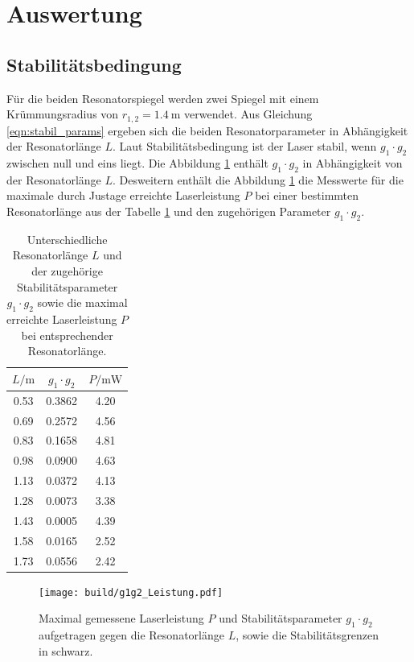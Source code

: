 \section{Auswertung}
\label{sec:Auswertung}



\subsection{Stabilitätsbedingung}
\label{subsec:Stabil}
Für die beiden Resonatorspiegel werden zwei Spiegel mit einem
Krümmungsradius von $r_{1,2}=\SI{1.4}{\meter}$ verwendet.
Aus Gleichung \eqref{eqn:stabil_params} ergeben sich die beiden
Resonatorparameter in Abhängigkeit der Resonatorlänge $L$.
Laut Stabilitätsbedingung ist der Laser stabil,
wenn $g_1\cdot g_2$ zwischen null und eins liegt.
Die Abbildung \ref{fig:oberaffengeilerplot} enthält $g_1 \cdot g_2$
in Abhängigkeit von der Resonatorlänge $L$.
Desweitern enthält die Abbildung \ref{fig:oberaffengeilerplot}
die Messwerte
für die maximale durch Justage
erreichte Laserleistung $P$
bei einer bestimmten Resonatorlänge
aus der Tabelle \ref{tab:stabil}
und den zugehörigen Parameter $g_1 \cdot g_2$.

\begin{table}
  \centering
  \caption{Unterschiedliche Resonatorlänge $L$ und der zugehörige Stabilitätsparameter $g_1 \cdot g_2$
  sowie die maximal erreichte Laserleistung $P$ bei entsprechender Resonatorlänge.}
  \label{tab:stabil}
  \begin{tabular}{ccc}
\toprule
$L/ \si{\meter}$ & $g_1 \cdot g_2$ & $ P/ \si{\milli\watt}$\\
\midrule
0.53	&	0.3862	&	4.20   \\
0.69	&	0.2572	&	4.56   \\
0.83	&	0.1658	&	4.81   \\
0.98	&	0.0900	&	4.63   \\
1.13	&	0.0372	&	4.13   \\
1.28	&	0.0073	&	3.38   \\
1.43	&	0.0005	&	4.39   \\
1.58	&	0.0165	&	2.52   \\
1.73	&	0.0556	&	2.42   \\
\bottomrule
  \end{tabular}
\end{table}


\begin{figure}
  \centering
  \texttt{[image: build/g1g2\_Leistung.pdf]}
  \caption{Maximal gemessene
  Laserleistung $P$ und
  Stabilitätsparameter $g_1\cdot g_2$ aufgetragen gegen
   die Resonatorlänge $L$, sowie
   die Stabilitätsgrenzen in schwarz.
  }
  \label{fig:oberaffengeilerplot}
\end{figure}



